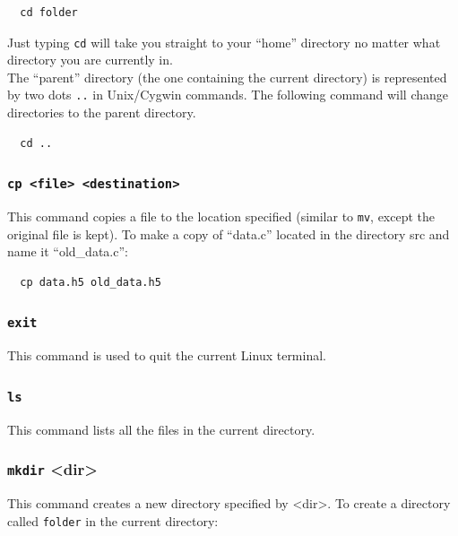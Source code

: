 \documentclass[10pt]{article}
\begin{document}
\begin{verbatim}
  cd folder
\end{verbatim}

\noindent Just typing \verb|cd| will take you straight to your ``home'' directory no matter what directory you are currently in.\\

\noindent The ``parent'' directory (the one containing the current directory) is represented by two dots \texttt{..} in Unix/Cygwin commands.  The following command will change directories to the parent directory.
\begin{verbatim}
  cd ..
\end{verbatim}
  
\subsubsection{\texttt{cp <file> <destination>}}
\noindent This command copies a file to the location specified (similar to \texttt{mv}, except the original file is kept).  To make a copy of ``data.c'' located in the directory src and name it ``old\_data.c'':

\begin{verbatim}
  cp data.h5 old_data.h5
\end{verbatim}

\subsubsection{\texttt{exit}}
\noindent This command is used to quit the current Linux terminal.

%
      
\subsubsection{\texttt{ls}}
\noindent This command lists all the files in the current directory.

\subsubsection{\texttt{mkdir} \textless dir\textgreater}
\noindent This command creates a new directory specified by \textless dir\textgreater.  To create a directory called \texttt{folder} in the current directory:
\end{document}
